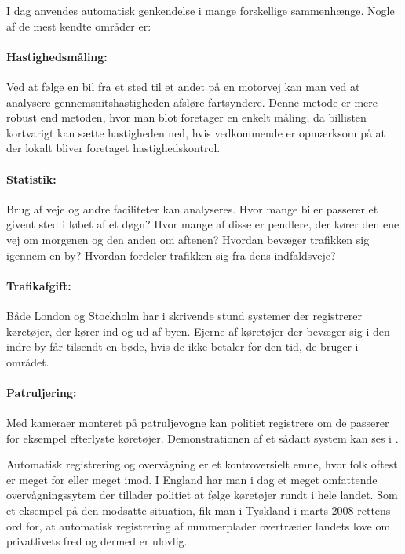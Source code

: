 I dag anvendes automatisk genkendelse i mange forskellige sammenhænge. Nogle af de mest kendte områder er:

\paragraph{Hastighedsmåling:}
Ved at følge en bil fra et sted til et andet på en motorvej kan man ved at analysere gennemsnitshastigheden afsløre fartsyndere. Denne metode er mere robust end metoden, hvor man blot foretager en enkelt måling, da billisten kortvarigt kan sætte hastigheden ned, hvis vedkommende er opmærksom på at der lokalt bliver foretaget hastighedskontrol.

\paragraph{Statistik:}
Brug af veje og andre faciliteter kan analyseres. Hvor mange biler passerer et givent sted i løbet af et døgn? Hvor mange af disse er pendlere, der kører den ene vej om morgenen og den anden om aftenen? Hvordan bevæger trafikken sig igennem en by? Hvordan fordeler trafikken sig fra dens indfaldsveje?

\paragraph{Trafikafgift:}
Både London og Stockholm har i skrivende stund systemer der registrerer køretøjer, der kører ind og ud af byen. Ejerne af køretøjer der bevæger sig i den indre by får tilsendt en bøde, hvis de ikke betaler for den tid, de bruger i området.

\paragraph{Patruljering:}
Med kameraer monteret på patruljevogne kan politiet registrere om de passerer for eksempel efterlyste køretøjer. Demonstrationen af et sådant system kan ses i \cite{canada_demo}. 

Automatisk registrering og overvågning er et kontroversielt emne, hvor folk oftest er meget for eller meget imod. I England har man i dag et meget omfattende overvågningssytem der tillader politiet at følge køretøjer rundt i hele landet\cite{wiki_baggrund}. Som et eksempel på den modsatte situation, fik man i Tyskland i marts 2008 rettens ord for, at automatisk registrering af nummerplader overtræder landets love om privatlivets fred og dermed er ulovlig\cite{tysk_ulovlig}.


